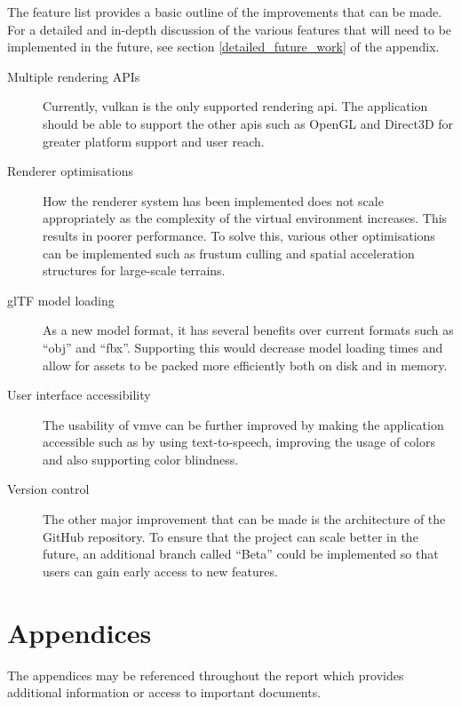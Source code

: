 \documentclass[11pt]{article}
\begin{document}
The feature list provides a basic outline of the improvements that can be made.
For a detailed and in-depth discussion of the various features that will need to
be implemented in the future, see section \ref{detailed_future_work} of the
appendix.
\begin{description}
  \item[Multiple rendering APIs] Currently, \gls*{vulkan} is the only supported
    rendering \gls*{api}. The application should be able to support the other
    \glspl*{api} such as OpenGL and Direct3D for greater platform support and
    user reach.
  \item[Renderer optimisations] How the renderer system has been implemented
    does not scale appropriately as the complexity of the virtual environment
    increases. This results in poorer performance. To solve this, various other
    optimisations can be implemented such as frustum culling and spatial
    acceleration structures for large-scale terrains.
  \item[glTF model loading] As a new model format, it has several benefits over
    current formats such as ``obj'' and ``fbx''. Supporting this would decrease
    model loading times and allow for assets to be packed more efficiently both
    on disk and in memory.
  \item[User interface accessibility]
    The usability of \gls*{vmve} can be further improved by making the
    application accessible such as by using text-to-speech, improving the usage
    of colors and also supporting color blindness.
  \item[Version control] The other major improvement that can be made is the
    architecture of the GitHub repository. To ensure that the project can scale
    better in the future, an additional branch called ``Beta'' could be
    implemented so that users can gain early access to new features.
  
\end{description}



\clearpage



\clearpage
\section{Appendices}
\renewcommand{\thesubsection}{\Alph{subsection}}

The appendices may be referenced throughout the report which provides additional
information or access to important documents.
\end{document}
